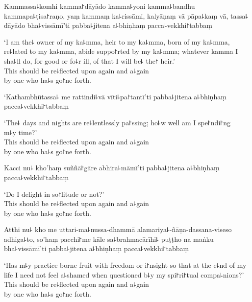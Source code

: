 Kammassa꜕komhi kamma꜓dāyādo kamma꜕yoni kamma꜕bandhu kammapa꜕ṭisa꜓raṇo, yaṃ kammaṃ ka꜕rissāmi, kalyāṇaṃ vā pāpa꜕kaṃ vā, tassa꜕ dāyādo bha꜕vissāmī'ti pabba꜕jitena a꜕bhiṇhaṃ pacca꜕vekkhi꜓tabbaṃ

\begin{english}
  `I am the꜕ owner of my ka꜕mma, heir to my ka꜕mma, born of my ka꜕mma,\\
  re꜕lated to my ka꜕mma, abide suppo꜓rted by my ka꜕mma; whatever kamma I sha꜕ll do, for good or fo꜕r ill, of that I will be꜕ the꜓ heir.'\\
  This should be re꜕flected upon again and a꜕gain\\
  by one who ha꜕s go꜓ne forth.
\end{english}

\clearpage

`Kathambhūtassa꜕ me rattindi꜕vā vīti꜕pa꜓tantī'ti pabba꜕jitena a꜕bhiṇhaṃ pacca꜕vekkhi꜓tabbaṃ

\begin{english}
  `The꜕ days and nights are re꜕lentlessly pa꜓ssing; ho꜕w well am I spe꜓ndi꜓ng\\ m꜕y time?'\\
  This should be re꜕flected upon again and a꜕gain\\
  by one who ha꜕s go꜓ne forth.
\end{english}

Kacci nu꜕ kho'haṃ suññā꜓gāre abhira꜕māmī'ti pabba꜕jitena a꜕bhiṇhaṃ pacca꜕vekkhi꜓tabbaṃ

\begin{english}
  `Do I delight in so꜓litude or not?'\\
  This should be re꜕flected upon again and a꜕gain\\
  by one who ha꜕s go꜓ne forth.
\end{english}

Atthi nu꜕ kho me uttari-ma꜕nussa-dhammā alamariya꜕-ñāṇa-dassana-viseso adhiga꜕to, so'haṃ pacchi꜓me kāle sa꜕brahmacārīhi꜕ puṭṭho na maṅku bha꜕vissāmī'ti pabba꜕jitena a꜕bhiṇhaṃ pacca꜕vekkhi꜓tabbaṃ

\begin{english}
  `Has m꜕y practice borne fruit with freedom or i꜓nsight so that at the e꜕nd of my life I need not feel a꜕shamed when questioned b꜕y my spi꜓ri꜓tual compa꜕nions?'\\
  This should be re꜕flected upon again and a꜕gain\\
  by one who ha꜕s go꜓ne forth.
\end{english}

